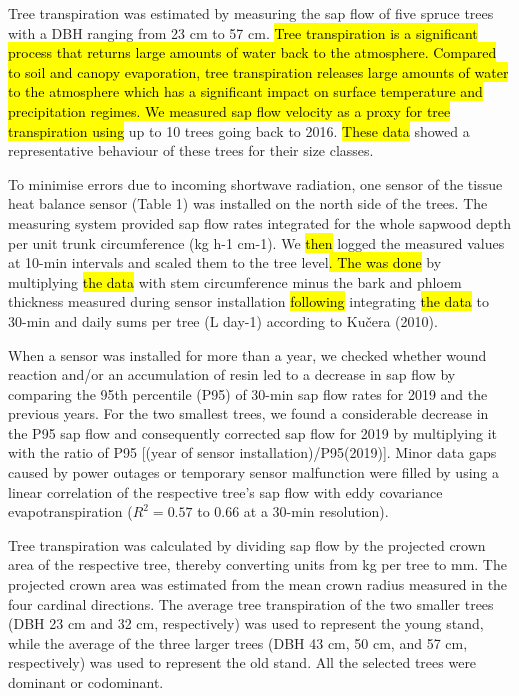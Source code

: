 \documentclass[10pt,letterpaper]{article}
\begin{document}
Tree transpiration was estimated by measuring the sap flow of five spruce trees with a DBH ranging from 23 cm to 57 cm. \hl{Tree transpiration is a significant process that returns large amounts of water back to the atmosphere. Compared to soil and canopy evaporation, tree transpiration releases large amounts of water to the atmosphere which has a significant impact on surface temperature and precipitation regimes. We measured sap flow velocity as a proxy for tree transpiration using }up to 10 trees going back to 2016. \hl{These data }showed a representative behaviour of these trees for their size classes. 

To minimise errors due to incoming shortwave radiation, one sensor of the tissue heat balance sensor (Table 1) was installed on the north side of the trees. The measuring system provided sap flow rates integrated for the whole sapwood depth per unit trunk circumference (kg h-1 cm-1). We \hl{then }logged the measured values at 10-min intervals and\hl{ }scaled them to the tree level\hl{. The was done }by multiplying \hl{the data} with stem circumference\hl{ }minus the bark and phloem thickness measured during sensor installation\hl{ following} integrating \hl{the data} to 30-min and daily sums per tree (L day-1) according to Kučera (2010). 

When a sensor was installed for more than a year, we checked whether wound reaction and/or an accumulation of resin led to a decrease in sap flow by comparing the 95th percentile (P95) of 30-min sap flow rates for 2019 and the previous years. For the two smallest trees, we found a considerable decrease in the P95 sap flow and consequently corrected sap flow for 2019 by multiplying it with the ratio of P95 [(year of sensor installation)/P95(2019)]. Minor data gaps caused by power outages or temporary sensor malfunction were filled by using a linear correlation of the respective tree’s sap flow with eddy covariance evapotranspiration ($R^2 = 0.57$ to 0.66 at a 30-min resolution). 

Tree transpiration was calculated by dividing sap flow by the projected crown area of the respective tree, thereby converting units from kg per tree to mm. The projected crown area was estimated from the mean crown radius measured in the four cardinal directions. The average tree transpiration of the two smaller trees (DBH 23 cm and 32 cm, respectively) was used to represent the young stand, while the average of the three larger trees (DBH 43 cm, 50 cm, and 57 cm, respectively) was used to represent the old stand. All the selected trees were dominant or codominant.
\end{document}
